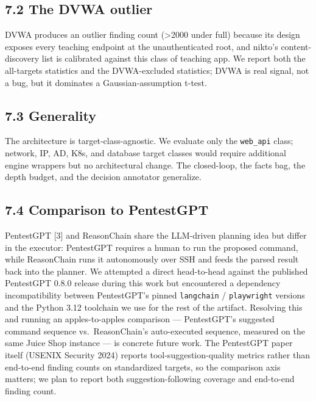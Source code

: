 \documentclass[
]{article}
\begin{document}
\subsection{7.2 The DVWA outlier}\label{the-dvwa-outlier}

DVWA produces an outlier finding count (\textgreater2000 under full)
because its design exposes every teaching endpoint at the
unauthenticated root, and nikto's content-discovery list is calibrated
against this class of teaching app. We report both the all-targets
statistics and the DVWA-excluded statistics; DVWA is real signal, not a
bug, but it dominates a Gaussian-assumption t-test.

\subsection{7.3 Generality}\label{generality}

The architecture is target-class-agnostic. We evaluate only the
\texttt{web\_api} class; network, IP, AD, K8s, and database target
classes would require additional engine wrappers but no architectural
change. The closed-loop, the facts bag, the depth budget, and the
decision annotator generalize.

\subsection{7.4 Comparison to
PentestGPT}\label{comparison-to-pentestgpt}

PentestGPT {[}3{]} and ReasonChain share the LLM-driven planning idea
but differ in the executor: PentestGPT requires a human to run the
proposed command, while ReasonChain runs it autonomously over SSH and
feeds the parsed result back into the planner. We attempted a direct
head-to-head against the published PentestGPT 0.8.0 release during this
work but encountered a dependency incompatibility between PentestGPT's
pinned \texttt{langchain} / \texttt{playwright} versions and the Python
3.12 toolchain we use for the rest of the artifact. Resolving this and
running an apples-to-apples comparison --- PentestGPT's suggested
command sequence vs.~ReasonChain's auto-executed sequence, measured on
the same Juice Shop instance --- is concrete future work. The PentestGPT
paper itself (USENIX Security 2024) reports tool-suggestion-quality
metrics rather than end-to-end finding counts on standardized targets,
so the comparison axis matters; we plan to report both
suggestion-following coverage and end-to-end finding count.
\end{document}
